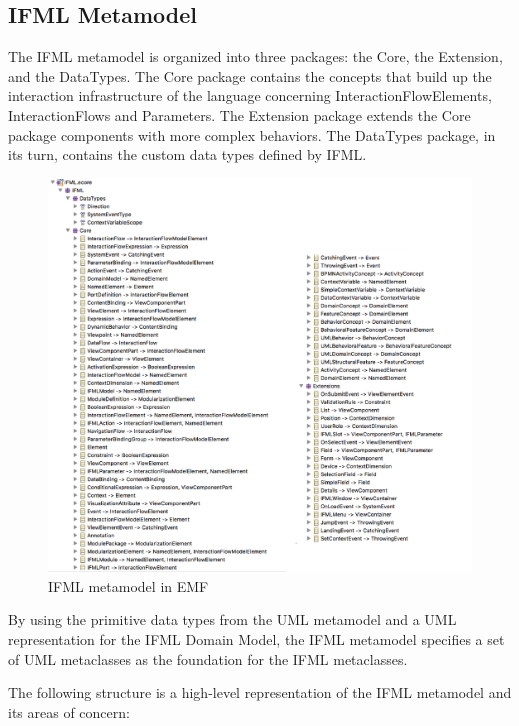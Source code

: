 \subsection{IFML Metamodel}

The IFML metamodel is organized into three packages: the Core, the Extension, and the DataTypes. The Core package contains the concepts that build up the interaction infrastructure of the language concerning InteractionFlowElements, InteractionFlows and Parameters. The Extension package extends the Core package components with more complex behaviors. The DataTypes package, in its turn, contains the custom data types defined by IFML.

\vspace{0.5cm}
\begin{figure}[H]
  \centering
    \includegraphics[width=16cm]{images/diagrams/ifml-ecore.png}
  \caption{IFML metamodel in EMF}
  \label{fig:ifml-ecore-representation}
\end{figure}
\vspace{0.5cm}

By using the primitive data types from the UML metamodel and a UML representation for the IFML Domain Model, the IFML metamodel specifies a set of UML metaclasses as the foundation for the IFML metaclasses.

\newpage
The following structure is a high-level representation of the IFML metamodel and its areas of concern:

